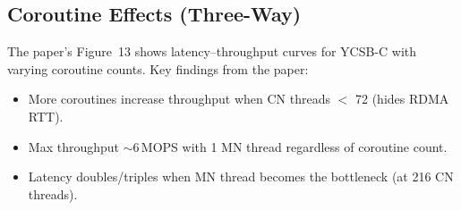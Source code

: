\documentclass[conference]{IEEEtran}
\begin{document}
\subsection{Coroutine Effects (Three-Way)}

The paper's Figure~13 shows latency--throughput curves for YCSB-C with varying coroutine counts. Key findings from the paper:
\begin{itemize}[nosep]
  \item More coroutines increase throughput when CN threads $<$ 72 (hides RDMA RTT).
  \item Max throughput $\sim$6\,MOPS with 1 MN thread regardless of coroutine count.
  \item Latency doubles/triples when MN thread becomes the bottleneck (at 216 CN threads).
\end{itemize}
\end{document}
